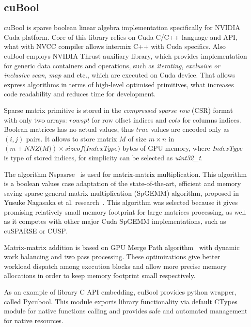 \subsection{cuBool}

cuBool is sparse boolean linear algebra implementation specifically for NVIDIA Cuda platform. Core of this 
library relies on Cuda C/C++ language and API, what with NVCC compiler allows intermix C++ with Cuda 
specifics. Also cuBool employs NVIDIA Thrust auxiliary library, which provides 
implementation for generic data containers and operations, such as \textit{iterating}, \textit{exclusive or 
inclusive scan}, \textit{map} and etc., which are executed on Cuda device. That allows express algorithms in 
terms of high-level optimised primitives, what increases code readability and reduces time for development.

Sparse matrix primitive is stored in the \textit{compressed sparse row} (CSR) format with only two arrays: 
$rowspt$ for row offset indices and $cols$ for columns indices. Boolean matrices has no actual values, thus 
$true$ values are encoded only as $(i, j)$ pairs. It allows to store matrix $M$ of size $m \times n$ 
in $(m + \textit{NNZ(M)}) \times \textit{sizeof(IndexType)}$ bytes of GPU memory, where 
\textit{IndexType} is type of stored indices, for simplicity can be selected as \textit{uint32\_t}.

The algorithm Nspasrse~\cite{inproceedings:cfqp_for_redisgraph} is used for matrix-matrix multiplication. 
This algorithm is a boolean values case 
adaptation of the state-of-the-art, efficient and memory saving sparse general matrix multiplication (SpGEMM) 
algorithm, proposed in Yusuke Nagasaka et al. research~\cite{algo:spgemm:8025284}. This algorithm was selected because it 
gives promising relatively small memory footprint for large matrices processing, as well as it competes with 
other major Cuda SpGEMM implementations, such as cuSPARSE or CUSP.  

Matrix-matrix addition is based on GPU Merge Path algorithm~\cite{inproceedings:gpu_merge_path} with 
dynamic work balancing and two pass processing. 
These optimizations give better workload dispatch among execution blocks and allow more precise memory allocations in
order to keep memory footprint small respectively. 

As an example of library C API embedding, cuBool provides python wrapper, called Pycubool. This module exports 
library functionality via default CTypes module for native functions calling and provides safe and automated 
management for native resources. 

